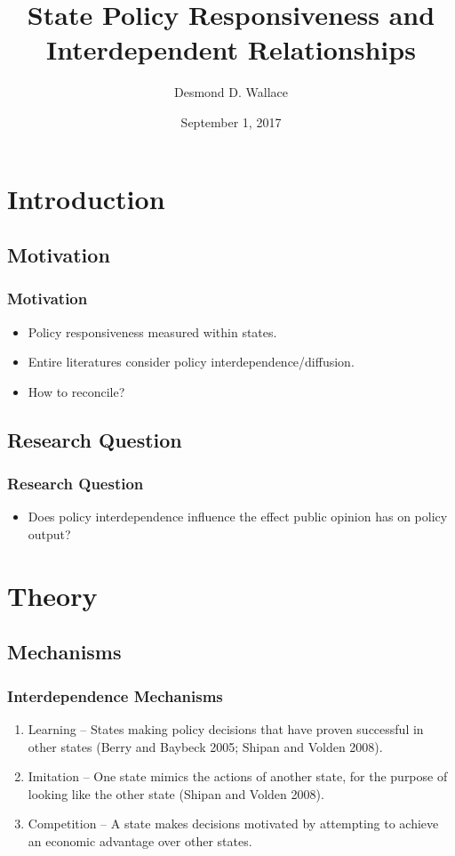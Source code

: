 \documentclass{beamer}
\title[2017 APSA Annual Meeting]{State Policy Responsiveness and Interdependent Relationships}
\author[Desmond D. Wallace]{Desmond D. Wallace}
\institute[University of Iowa]{Department of Political Science\\The University of Iowa\\Iowa City, IA}
\date{September 1, 2017}
\begin{document}
	
\begin{frame}
	\titlepage
\end{frame}

\section{Introduction}
\subsection{Motivation}

\begin{frame}
	\frametitle{Motivation}
		\begin{itemize}
			\item Policy responsiveness measured within states.
			\item Entire literatures consider policy interdependence/diffusion.
			\item How to reconcile?
		\end{itemize}
\end{frame}

\subsection{Research Question}

\begin{frame}
	\frametitle{Research Question}
		\begin{itemize}
			\item Does policy interdependence influence the effect public opinion has on policy output?
		\end{itemize}
\end{frame}

\section{Theory}
\subsection{Mechanisms}

\begin{frame}
	\frametitle{Interdependence Mechanisms}
		\begin{enumerate}
			\item Learning -- States making policy decisions that have proven successful in other states (Berry and Baybeck 2005; Shipan and Volden 2008).
			\item Imitation -- One state mimics the actions of another state, for the purpose of looking like the other state (Shipan and Volden 2008).
			\item Competition -- A state makes decisions motivated by attempting to achieve an economic advantage over other states.
		\end{enumerate}
\end{frame}
\end{document}
